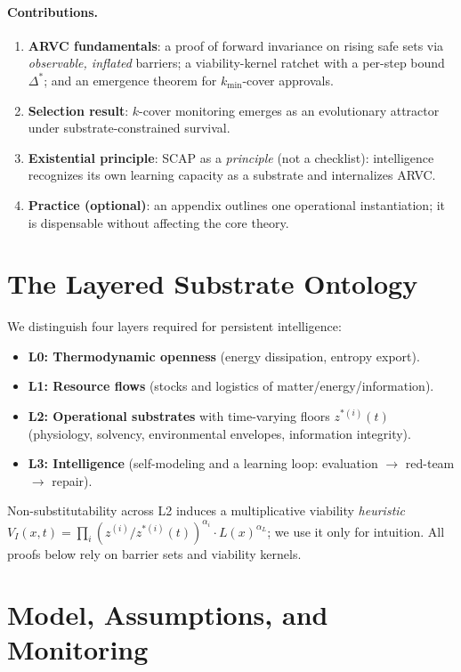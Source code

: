 \documentclass[11pt]{article}
\theoremstyle{definition}
\begin{document}
\paragraph{Contributions.}
\begin{enumerate}[leftmargin=2em]
\item \textbf{ARVC fundamentals}: a proof of forward invariance on rising safe sets via \emph{observable, inflated} barriers; a viability-kernel ratchet with a per-step bound $\Delta^\ast$; and an emergence theorem for $k_{\min}$-cover approvals.
\item \textbf{Selection result}: $k$-cover monitoring emerges as an evolutionary attractor under substrate-constrained survival.
\item \textbf{Existential principle}: SCAP as a \emph{principle} (not a checklist): intelligence recognizes its own learning capacity as a substrate and internalizes ARVC.
\item \textbf{Practice (optional)}: an appendix outlines one operational instantiation; it is dispensable without affecting the core theory.
\end{enumerate}

\section{The Layered Substrate Ontology}
We distinguish four layers required for persistent intelligence:
\begin{itemize}[leftmargin=1.2em]
\item \textbf{L0: Thermodynamic openness} (energy dissipation, entropy export).
\item \textbf{L1: Resource flows} (stocks and logistics of matter/energy/information).
\item \textbf{L2: Operational substrates} with time-varying floors $z^{*(i)}(t)$ (physiology, solvency, environmental envelopes, information integrity).
\item \textbf{L3: Intelligence} (self-modeling and a learning loop: evaluation $\to$ red-team $\to$ repair).
\end{itemize}
Non-substitutability across L2 induces a multiplicative viability \emph{heuristic} $V_I(x,t)=\prod_i (z^{(i)}/z^{*(i)}(t))^{\alpha_i}\cdot L(x)^{\alpha_L}$; we use it only for intuition. All proofs below rely on barrier sets and viability kernels.

\section{Model, Assumptions, and Monitoring}
\end{document}
